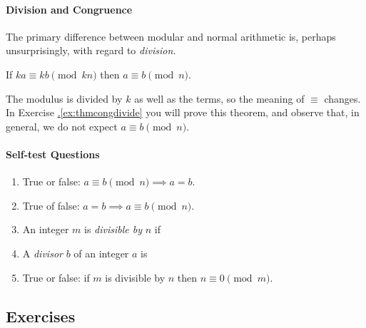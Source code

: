 \paragraph{Division and Congruence}

The primary difference between modular and normal arithmetic is, perhaps unsurprisingly, with regard to \emph{division.}

\begin{thm}\label{thm:congdivide}
If $ka\equiv kb\pmod{kn}$ then $a\equiv b\pmod n$.
\end{thm}

\noindent The modulus is divided by $k$ as well as the terms, so the meaning of $\equiv$ changes. In Exercise \hyperref[ex:thmcongdivide]{\thesubsection.\ref*{ex:thmcongdivide}} you will prove this theorem, and observe that, in general, we do not expect $a\equiv b\pmod n$.


\paragraph{Self-test Questions}

\begin{enumerate}
  \item True or false: $a\equiv b\pmod n\implies a=b$.
  \item True of false: $a=b\implies a\equiv b\pmod n$.
  \item An integer $m$ is \emph{divisible by} $n$ if \underline{\phantom{$\exists k\in\Z:m=kn$}\qquad\qquad}
  \item A \emph{divisor} $b$ of an integer $a$ is \underline{\phantom{an integer $b$ such that $b\divides a$}\qquad\qquad}
  \item True or false: if $m$ is divisible by $n$ then $n\equiv 0\pmod m$.
\end{enumerate}

\subsection*{Exercises}


